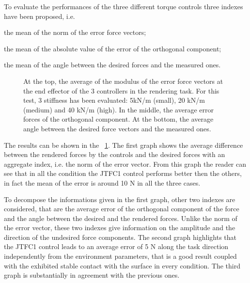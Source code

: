 \par To evaluate the performances of the three different torque controls three indexes have been proposed, i.e. 
\DIFdelbegin %
\DIFdelend \DIFaddbegin 

\setlength{\IEEEiednormlabelsep}{0.7 cm}
\begin{IEEEitemize}
	\DIFaddend \item the mean of the norm of the error force vectors;
	\item the mean of the absolute value of the error of the orthogonal component;
	\item the mean of the angle between the desired forces and the measured ones.
\DIFdelbegin %
\DIFdelend \DIFaddbegin \end{IEEEitemize}
\DIFaddend 

\begin{figure}[htb]
	\centering
\DIFdelbeginFL %
\DIFdelendFL %
	\DIFaddbeginFL \def\svgwidth{1\columnwidth}
	\begin{footnotesize}
		
	\end{footnotesize}
	\DIFaddendFL \caption{At the top, the average of the modulus of the error force vectors at the end effector of the 3 controllers in the rendering task. For this test, 3 stiffness has been evaluated: 5kN/m (small), 20 kN/m (medium) and 40 kN/m (high). In the middle, the average error forces of the orthogonal component. At the bottom, the average angle between the desired force vectors and the measured ones.}
	\label{fig:renderingErrors}
\end{figure}

\par The results can be shown in the \figurename \ \ref{fig:renderingErrors}. The first graph shows the average difference between the rendered forces by the controls and the desired forces with an aggregate index, i.e. the norm of the error vector. From this graph the reader can see that in all the condition the JTFC1 control performs better then the others, in fact the mean of the error is around 10 N in all the three cases.
\par To decompose the informations given in the first graph, other two indexes are considered, that are the average error of the orthogonal component of the force and the angle between the desired and the rendered forces. Unlike the norm of the error vector, these two indexes give information on the amplitude and the direction of the undesired force components. The second graph highlights that the JTFC1 control leads to an average error of 5 N along the task direction independently from the environment parameters, that is a good result coupled with the exhibited stable contact with the surface in every condition.
The third graph is substantially in agreement with the previous ones. \DIFdelbegin %

